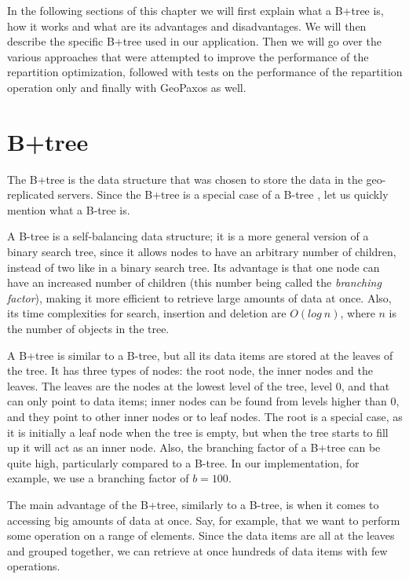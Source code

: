 In the following sections of this chapter we will first explain what a B+tree is, how it works and what are its advantages and disadvantages. We will then describe the specific B+tree used in our application. Then we will go over the various approaches that were attempted to improve the performance of the repartition optimization, followed with tests on the performance of the repartition operation only and finally with GeoPaxos as well.

\section{B+tree}\label{sec:B+tree}
The B+tree is the data structure that was chosen to store the data in the geo-replicated servers. Since the B+tree is a special case of a B-tree \citep{b-tree}, let us quickly mention what a B-tree \citep{b-tree} is.

A B-tree is a self-balancing data structure; it is a more general version of a binary search tree, since it allows nodes to have an arbitrary number of children, instead of two like in a binary search tree. Its advantage is that one node can have an increased number of children (this number being called the \emph{branching factor}), making it more efficient to retrieve large amounts of data at once. Also, its time complexities for search, insertion and deletion are $O(log\ n)$, where $n$ is the number of objects in the tree.

A B+tree is similar to a B-tree, but all its data items are stored at the leaves of the tree. It has three types of nodes: the root node, the inner nodes and the leaves. The leaves are the nodes at the lowest level of the tree, level 0, and that can only point to data items; inner nodes can be found from levels higher than 0, and they point to other inner nodes or to leaf nodes. The root is a special case, as it is initially a leaf node when the tree is empty, but when the tree starts to fill up it will act as an inner node. Also, the branching factor of a B+tree can be quite high, particularly compared to a B-tree. In our implementation, for example, we use a branching factor of $b=100$.

The main advantage of the B+tree, similarly to a B-tree, is when it comes to accessing big amounts of data at once. Say, for example, that we want to perform some operation on a range of elements. Since the data items are all at the leaves and grouped together, we can retrieve at once hundreds of data items with few operations.


